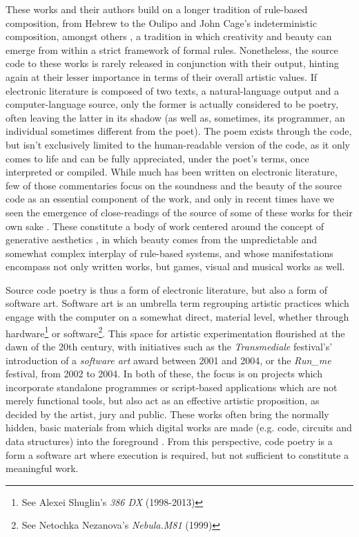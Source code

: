 These works and their authors build on a longer tradition of rule-based composition, from Hebrew to the Oulipo and John Cage's indeterministic composition, amongst others \citep{cramer_words_2003}, a tradition in which creativity and beauty can emerge from within a strict framework of formal rules. Nonetheless, the source code to these works is rarely released in conjunction with their output, hinting again at their lesser importance in terms of their overall artistic values. If electronic literature is composed of two texts, a natural-language output and a computer-language source, only the former is actually considered to be poetry, often leaving the latter in its shadow (as well as, sometimes, its programmer, an individual sometimes different from the poet). The poem exists through the code, but isn't exclusively limited to the human-readable version of the code, as it only comes to life and can be fully appreciated, under the poet's terms, once interpreted or compiled. While much has been written on electronic literature, few of those commentaries focus on the soundness and the beauty of the source code as an essential component of the work, and only in recent times have we seen the emergence of close-readings of the source of some of these works for their own sake \citep{montfort_10_2014,marino_critical_2020,brock_rhetorical_2019}. These constitute a body of work centered around the concept of generative aesthetics \citep{goriunova_read_2005}, in which beauty comes from the unpredictable and somewhat complex interplay of rule-based systems, and whose manifestations encompass not only written works, but games, visual and musical works as well.

Source code poetry is thus a form of electronic literature, but also a form of  software art. Software art is an umbrella term regrouping artistic practices which engage with the computer on a somewhat direct, material level, whether through hardware\footnote{See Alexei Shuglin's \emph{386 DX} (1998-2013)} or software\footnote{See Netochka Nezanova's \emph{Nebula.M81} (1999)}. This space for artistic experimentation flourished at the dawn of the 20th century, with initiatives such as the \emph{Transmediale} festival's' introduction of a \emph{software art} award between 2001 and 2004, or the \emph{Run\_me} festival, from 2002 to 2004. In both of these, the focus is on projects which incorporate standalone programmes or script-based applications which are not merely functional tools, but also act as an effective artistic proposition, as decided by the artist, jury and public. These works often bring the normally hidden, basic materials from which digital works are made (e.g. code, circuits and data structures) into the foreground \citep{yuill_code_2004}. From this perspective, code poetry is a form a software art where execution is required, but not sufficient to constitute a meaningful work.

